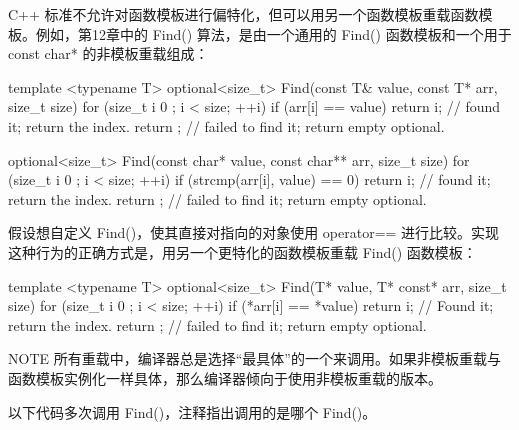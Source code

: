 C++ 标准不允许对函数模板进行偏特化，但可以用另一个函数模板重载函数模板。例如，第12章中的 Find() 算法，是由一个通用的 Find() 函数模板和一个用于 const char* 的非模板重载组成：

\begin{cpp}
template <typename T>
optional<size_t> Find(const T& value, const T* arr, size_t size)
{
    for (size_t i { 0 }; i < size; ++i) {
        if (arr[i] == value) {
            return i; // found it; return the index.
        }
    }
    return {}; // failed to find it; return empty optional.
}

optional<size_t> Find(const char* value, const char** arr, size_t size)
{
    for (size_t i { 0 }; i < size; ++i) {
        if (strcmp(arr[i], value) == 0) {
            return i; // found it; return the index.
        }
    }
    return {}; // failed to find it; return empty optional.
}
\end{cpp}

假设想自定义 Find()，使其直接对指向的对象使用 operator== 进行比较。实现这种行为的正确方式是，用另一个更特化的函数模板重载 Find() 函数模板：

\begin{cpp}
template <typename T>
optional<size_t> Find(T* value, T* const* arr, size_t size)
{
    for (size_t i { 0 }; i < size; ++i) {
        if (*arr[i] == *value) {
            return i; // Found it; return the index.
        }
    }
    return {}; // failed to find it; return empty optional.
}
\end{cpp}

\begin{myNotic}{NOTE}
所有重载中，编译器总是选择“最具体”的一个来调用。如果非模板重载与函数模板实例化一样具体，那么编译器倾向于使用非模板重载的版本。
\end{myNotic}

以下代码多次调用 Find()，注释指出调用的是哪个 Find()。

